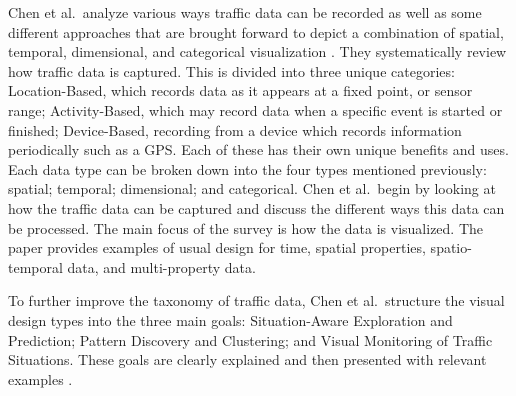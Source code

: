 Chen et al.\ analyze various ways traffic data can be recorded as well as some different approaches that are brought forward to depict a combination of spatial, temporal, dimensional, and categorical visualization \cite{chen2015survey}.
They systematically review how traffic data is captured. This is divided into three unique categories: Location-Based, which records data as it appears at a fixed point, or sensor range; Activity-Based, which may record data when a specific event is started or finished; Device-Based, recording from a device which records information periodically such as a GPS. Each of these has their own unique benefits and uses. Each data type can be broken down into the four types mentioned previously: spatial; temporal; dimensional; and categorical.
Chen et al.\ begin by looking at how the traffic data can be captured and discuss the different ways this data can be processed. The main focus of the survey is how the data is visualized. The paper provides examples of usual design for time, spatial properties, spatio-temporal data, and multi-property data.

To further improve the taxonomy of traffic data, Chen et al.\ structure the visual design types into the three main goals: Situation-Aware Exploration and Prediction; Pattern Discovery and Clustering; and Visual Monitoring of Traffic Situations. These goals are clearly explained and then presented with relevant examples \cite{chen2015survey}. 

